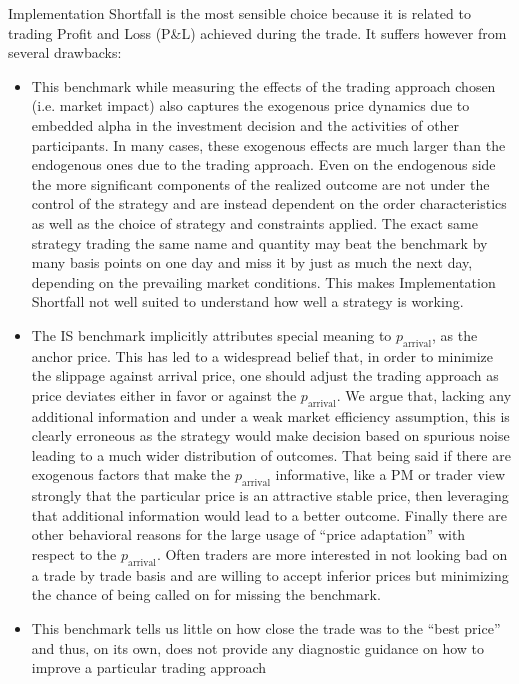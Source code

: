 Implementation Shortfall is the most sensible choice because it is related to trading Profit and Loss (P\&L) achieved during the trade.  It suffers however from several drawbacks:

\begin{itemize}
\item This benchmark while measuring the effects of the trading approach chosen (i.e. market impact) also captures the exogenous price dynamics due to embedded alpha in the investment decision and the activities of other participants. In many cases, these exogenous effects are much larger than the endogenous ones due to the trading approach. Even on the endogenous side the more significant components of the realized outcome are not under the control of the strategy and are instead dependent on the order characteristics as well as the choice of strategy and constraints applied. The exact same strategy trading the same name and quantity may beat the benchmark by many basis points on one day and miss it by just as much the next day, depending on the prevailing market conditions. This makes Implementation Shortfall not well suited to understand how well a strategy is working.

\item The IS benchmark implicitly attributes special meaning to $p_{\text{arrival}}$, as the anchor price. This has led to a widespread belief that, in order to minimize the slippage against arrival price, one should adjust the trading approach as price deviates either in favor or against the $p_{\text{arrival}}$. We argue that, lacking any additional information and under a weak market efficiency assumption, this is clearly erroneous as the strategy would make decision based on spurious noise leading to a much wider distribution of outcomes. That being said if there are exogenous factors that make the $p_{\text{arrival}}$ informative, like a PM or trader view strongly that the particular price is an attractive stable price, then leveraging that additional information would lead to a better outcome. Finally there are other behavioral reasons for the large usage of ``price adaptation'' with respect to the $p_{\text{arrival}}$. Often traders are more interested in not looking bad on a trade by trade basis and are willing to accept inferior prices but minimizing the chance of being called on for missing the benchmark.

\item This benchmark tells us little on how close the trade was to the ``best price'' and thus, on its own, does not provide any diagnostic guidance on how to improve a particular trading approach
\end{itemize}


